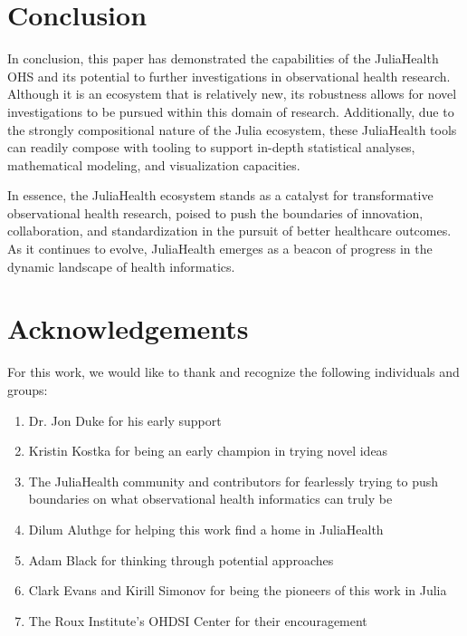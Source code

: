 \documentclass{juliacon}
\begin{document}
\section{Conclusion}

In conclusion, this paper has demonstrated the capabilities of the JuliaHealth OHS and its potential to further investigations in observational health research.
Although it is an ecosystem that is relatively new, its robustness allows for novel investigations to be pursued within this domain of research. 
Additionally, due to the strongly compositional nature of the Julia ecosystem, these JuliaHealth tools can readily compose with tooling to support in-depth statistical analyses, mathematical modeling, and visualization capacities.

In essence, the JuliaHealth ecosystem stands as a catalyst for transformative observational health research, poised to push the boundaries of innovation, collaboration, and standardization in the pursuit of better healthcare outcomes. As it continues to evolve, JuliaHealth emerges as a beacon of progress in the dynamic landscape of health informatics.

\section{Acknowledgements}

For this work, we would like to thank and recognize the following individuals and groups: 

\begin{enumerate}

  \item Dr. Jon Duke for his early support
  \item Kristin Kostka for being an early champion in trying novel ideas
  \item The JuliaHealth community and contributors for fearlessly trying to push boundaries on what observational health informatics can truly be
  \item Dilum Aluthge for helping this work find a home in JuliaHealth
  \item Adam Black for thinking through potential approaches
  \item Clark Evans and Kirill Simonov for being the pioneers of this work in Julia
  \item The Roux Institute's OHDSI Center for their encouragement

\end{enumerate}
\end{document}
